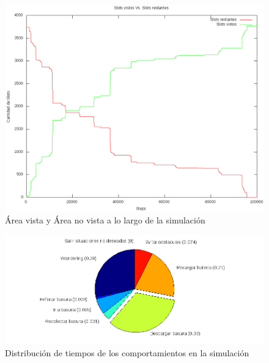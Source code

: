 \begin{figure}[htp]
\begin{center}
\includegraphics[scale=0.3]{comportamientos/graphics/areaCoveredVsTimeUse.png}
\caption{\'Area vista y \'Area no vista a lo largo de la simulaci\'on}
\label{fig:seenArea}
\end{center}
\end{figure}

\begin{figure}[htp]
\begin{center}
\includegraphics[scale=0.3]{comportamientos/graphics/BehaviourDistributionPieUse.png}
\caption{Distribuci\'on de tiempos de los comportamientos en la simulaci\'on}
\label{fig:behaviourDistribution}
\end{center}
\end{figure}


